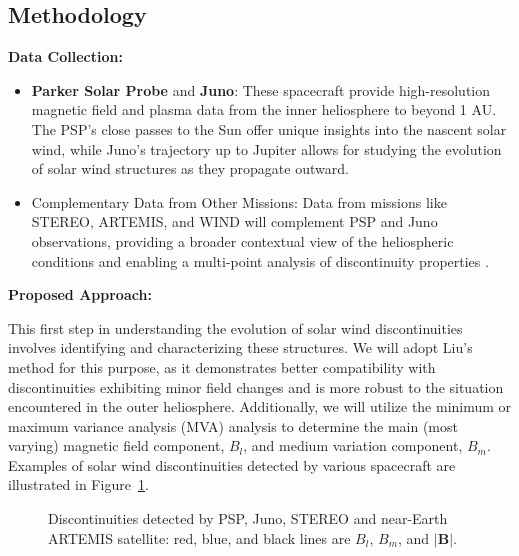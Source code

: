 \documentclass[
  letterpaper,
  DIV=11,
  numbers=noendperiod]{scrartcl}
\begin{document}
\subsection{Methodology}\label{methodology}

\textbf{Data Collection:}

\begin{itemize}
\item
  \textbf{Parker Solar Probe} and \textbf{Juno}: These spacecraft provide high-resolution magnetic field and plasma data from the inner heliosphere to beyond 1 AU. The PSP's close passes to the Sun offer unique insights into the nascent solar wind, while Juno's trajectory up to Jupiter allows for studying the evolution of solar wind structures as they propagate outward.
\item
  Complementary Data from Other Missions: Data from missions like STEREO, ARTEMIS, and WIND will complement PSP and Juno observations, providing a broader contextual view of the heliospheric conditions and enabling a multi-point analysis of discontinuity properties \citep{velliUnderstandingOriginsHeliosphere2020}.
\end{itemize}

\textbf{Proposed Approach:}

This first step in understanding the evolution of solar wind discontinuities involves identifying and characterizing these structures. We will adopt Liu's method \citep{liuMagneticDiscontinuitiesSolar2022} for this purpose, as it demonstrates better compatibility with discontinuities exhibiting minor field changes and is more robust to the situation encountered in the outer heliosphere. Additionally, we will utilize the minimum or maximum variance analysis (MVA) analysis \citep{sonnerupMinimumMaximumVariance1998, sonnerupMagnetopauseStructureAttitude1967} to determine the main (most varying) magnetic field component, \(B_l\), and medium variation component, \(B_m\).
Examples of solar wind discontinuities detected by various spacecraft are illustrated in Figure~\ref{fig-examples}.

\begin{figure}


\caption{\label{fig-examples}Discontinuities detected by PSP, Juno, STEREO and near-Earth ARTEMIS satellite: red, blue, and black lines are \(B_l\), \(B_m\), and \(|{\mathbf B}|\).}

\end{figure}%
\end{document}
